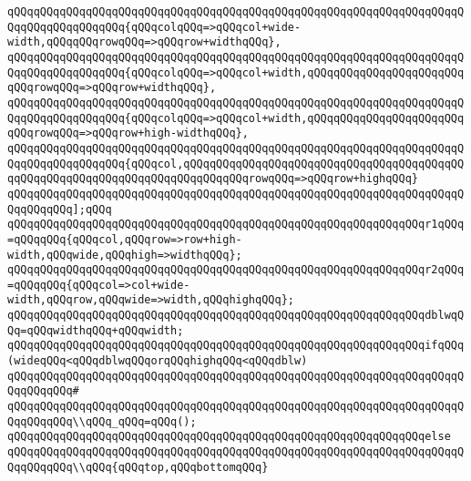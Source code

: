 \verb|qQQqqQQqqQQqqQQqqQQqqQQqqQQqqQQqqQQqqQQqqQQqqQQqqQQqqQQqqQQqqQQqqQQqqQQqqQQqqQQqqQQqqQQq{qQQqcolqQQq=>qQQqcol+wide-width,qQQqqQQqrowqQQq=>qQQqrow+widthqQQq},|\newline
\verb|qQQqqQQqqQQqqQQqqQQqqQQqqQQqqQQqqQQqqQQqqQQqqQQqqQQqqQQqqQQqqQQqqQQqqQQqqQQqqQQqqQQqqQQq{qQQqcolqQQq=>qQQqcol+width,qQQqqQQqqQQqqQQqqQQqqQQqqQQqrowqQQq=>qQQqrow+widthqQQq},|\newline
\verb|qQQqqQQqqQQqqQQqqQQqqQQqqQQqqQQqqQQqqQQqqQQqqQQqqQQqqQQqqQQqqQQqqQQqqQQqqQQqqQQqqQQqqQQq{qQQqcolqQQq=>qQQqcol+width,qQQqqQQqqQQqqQQqqQQqqQQqqQQqrowqQQq=>qQQqrow+high-widthqQQq},|\newline
\verb|qQQqqQQqqQQqqQQqqQQqqQQqqQQqqQQqqQQqqQQqqQQqqQQqqQQqqQQqqQQqqQQqqQQqqQQqqQQqqQQqqQQqqQQq{qQQqcol,qQQqqQQqqQQqqQQqqQQqqQQqqQQqqQQqqQQqqQQqqQQqqQQqqQQqqQQqqQQqqQQqqQQqqQQqqQQqqQQqrowqQQq=>qQQqrow+highqQQq}|\newline
\verb|qQQqqQQqqQQqqQQqqQQqqQQqqQQqqQQqqQQqqQQqqQQqqQQqqQQqqQQqqQQqqQQqqQQqqQQqqQQqqQQq];qQQq|\newline
\newline
\verb|qQQqqQQqqQQqqQQqqQQqqQQqqQQqqQQqqQQqqQQqqQQqqQQqqQQqqQQqqQQqqQQqr1qQQq=qQQqqQQq{qQQqcol,qQQqrow=>row+high-width,qQQqwide,qQQqhigh=>widthqQQq};|\newline
\verb|qQQqqQQqqQQqqQQqqQQqqQQqqQQqqQQqqQQqqQQqqQQqqQQqqQQqqQQqqQQqqQQqr2qQQq=qQQqqQQq{qQQqcol=>col+wide-width,qQQqrow,qQQqwide=>width,qQQqhighqQQq};|\newline
\newline
\verb|qQQqqQQqqQQqqQQqqQQqqQQqqQQqqQQqqQQqqQQqqQQqqQQqqQQqqQQqqQQqqQQqdblwqQQq=qQQqwidthqQQq+qQQqwidth;|\newline
\newline
\verb|qQQqqQQqqQQqqQQqqQQqqQQqqQQqqQQqqQQqqQQqqQQqqQQqqQQqqQQqqQQqqQQqifqQQq(wideqQQq<qQQqdblwqQQqorqQQqhighqQQq<qQQqdblw)|\newline
\verb|qQQqqQQqqQQqqQQqqQQqqQQqqQQqqQQqqQQqqQQqqQQqqQQqqQQqqQQqqQQqqQQqqQQqqQQqqQQqqQQq#|\newline
\verb|qQQqqQQqqQQqqQQqqQQqqQQqqQQqqQQqqQQqqQQqqQQqqQQqqQQqqQQqqQQqqQQqqQQqqQQqqQQqqQQq\\qQQq_qQQq=qQQq();|\newline
\verb|qQQqqQQqqQQqqQQqqQQqqQQqqQQqqQQqqQQqqQQqqQQqqQQqqQQqqQQqqQQqqQQqelse|\newline
\verb|qQQqqQQqqQQqqQQqqQQqqQQqqQQqqQQqqQQqqQQqqQQqqQQqqQQqqQQqqQQqqQQqqQQqqQQqqQQqqQQq\\qQQq{qQQqtop,qQQqbottomqQQq}|\newline
